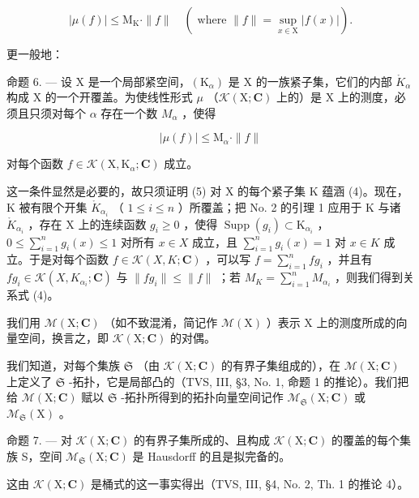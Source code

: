 \[
| \mu (f) | \leqslant \mathrm{M} _ {\mathrm{K}} \cdot \| f \| \quad (\text { where } \| f \| = \sup _ {x \in \mathrm{X}} | f (x) |).\tag{4}
\]

更一般地：

命题 6. --- 设 X 是一个局部紧空间，\((\mathrm{K}_{\alpha})\) 是 X 的一族紧子集，它们的内部 \(\mathring{K}_{\alpha}\) 构成 X 的一个开覆盖。为使线性形式 \(\mu\) （\(\mathcal{K}(\mathrm{X};\mathbf{C})\) 上的）是 X 上的测度，必须且只须对每个 \(\alpha\) 存在一个数 \(M_{\alpha}\) ，使得

\[
| \mu (f) | \leqslant \mathrm{M} _ {\alpha} \cdot \| f \|\tag{5}
\]

对每个函数 \(f \in \mathcal{K}(\mathrm{X}, \mathrm{K}_{\alpha}; \mathbf{C})\) 成立。

这一条件显然是必要的，故只须证明 (5) 对 X 的每个紧子集 K 蕴涵 (4)。现在，K 被有限个开集 \(\mathring{K}_{\alpha_{i}}\) （ \(1 \leqslant i \leqslant n\) ）所覆盖；把 No. 2 的引理 1 应用于 K 与诸 \(\mathring{K}_{\alpha_{i}}\) ，存在 X 上的连续函数 \(g_{i} \geqslant 0\) ，使得 \(\operatorname{Supp}(g_{i}) \subset \mathrm{K}_{\alpha_{i}}\) ，\(0 \leqslant \sum_{i=1}^{n} g_{i}(x) \leqslant 1\) 对所有 \(x \in X\) 成立，且 \(\sum_{i=1}^{n} g_{i}(x) = 1\) 对 \(x \in K\) 成立。于是对每个函数 \(f \in \mathcal{K}(X, K; \mathbf{C})\) ，可以写 \(f = \sum_{i=1}^{n} fg_{i}\) ，并且有 \(fg_{i} \in \mathcal{K}(X, K_{\alpha_{i}}; \mathbf{C})\) 与 \(\|fg_{i}\| \leqslant \|f\|\) ；若 \(M_{K} = \sum_{i=1}^{n} M_{\alpha_{i}}\) ，则我们得到关系式 (4)。

我们用 \(\mathcal{M}(\mathrm{X};\mathbf{C})\) （如不致混淆，简记作 \(\mathcal{M}(\mathrm{X})\) ）表示 \(\mathrm{X}\) 上的测度所成的向量空间，换言之，即 \(\mathcal{K}(\mathrm{X};\mathbf{C})\) 的对偶。

我们知道，对每个集族 \(\mathfrak{S}\) （由 \(\mathcal{K}(\mathrm{X};\mathbf{C})\) 的有界子集组成的），在 \(\mathcal{M}(\mathrm{X};\mathbf{C})\) 上定义了 \(\mathfrak{S}\) -拓扑，它是局部凸的（TVS, III, §3, No. 1, 命题 1 的推论）。我们把给 \(\mathcal{M}(\mathrm{X};\mathbf{C})\) 赋以 \(\mathfrak{S}\) -拓扑所得到的拓扑向量空间记作 \(\mathcal{M}_{\mathfrak{S}}(\mathrm{X};\mathbf{C})\) 或 \(\mathcal{M}_{\mathfrak{S}}(\mathrm{X})\) 。

命题 7. --- 对 \(\mathcal{K}(\mathrm{X};\mathbf{C})\) 的有界子集所成的、且构成 \(\mathcal{K}(\mathrm{X};\mathbf{C})\) 的覆盖的每个集族 S，空间 \(\mathcal{M}_{\mathfrak{S}}(\mathrm{X};\mathbf{C})\) 是 Hausdorff 的且是拟完备的。

这由 \(\mathcal{K}(\mathrm{X};\mathbf{C})\) 是桶式的这一事实得出（TVS, III, §4, No. 2, Th. 1 的推论 4）。


